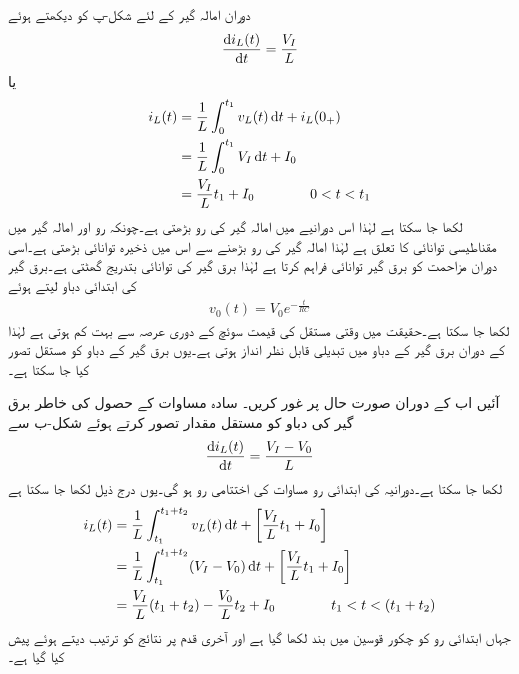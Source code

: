دوران  امالہ گیر کے لئے  شکل-پ کو دیکھتے ہوئے 
\begin{align*}
\frac{\dif i_L(t)}{\dif t}=\frac{V_I}{L}
\end{align*}
یا
\begin{gather}
\begin{aligned}\label{مساوات_عارضی_بڑھاتا_منبع_دباو_الف}
i_L(t)&=\frac{1}{L} \int_{0}^{t_1} v_L(t) \dif t+i_L(0_+)\\
&=\frac{1}{L}\int_{0}^{t_1} V_I \dif t+I_0\\
&=\frac{V_I}{L} t_1+I_0\quad \quad \quad \quad 0<t<t_1
\end{aligned}
\end{gather}
لکھا جا سکتا ہے لہٰذا اس دورانیے میں امالہ گیر کی رو بڑھتی ہے۔چونکہ  رو اور امالہ گیر میں مقناطیسی توانائی کا تعلق  ہے لہٰذا امالہ گیر کی رو بڑھنے سے اس میں ذخیرہ توانائی بڑھتی ہے۔اسی دوران مزاحمت  کو برق گیر توانائی فراہم کرتا ہے لہٰذا برق گیر کی توانائی بتدریج گھٹتی ہے۔برق گیر کی ابتدائی دباو  لیتے ہوئے 
\begin{align*}
v_0(t)=V_0 e^{-\frac{t}{RC}}
\end{align*}
لکھا جا سکتا ہے۔حقیقت میں  وقتی مستقل کی قیمت سوئچ کے دوری عرصہ  سے  بہت کم  ہوتی ہے  لہٰذا  کے دوران برق گیر کے دباو میں تبدیلی قابل نظر انداز ہوتی ہے۔یوں برق گیر کے دباو کو مستقل تصور کیا جا سکتا ہے۔

آئیں اب  کے دوران صورت حال پر غور کریں۔ سادہ مساوات کے حصول کی خاطر برق گیر کی دباو کو مستقل مقدار  تصور کرتے  ہوئے شکل-ب  سے
\begin{align*}
\frac{\dif i_L(t)}{\dif t}=\frac{V_I-V_0}{L}
\end{align*}
لکھا جا سکتا ہے۔دورانیہ  کی ابتدائی رو مساوات  کی اختتامی رو ہو گی۔یوں درج ذیل لکھا جا سکتا ہے 
\begin{gather}
\begin{aligned}\label{مساوات_عارضی_بڑھاتا_منبع_دباو_ب}
i_L(t)&=\frac{1}{L}\int_{t_1}^{t_1+t_2} v_L(t) \dif t+\left[\frac{V_I}{L} t_1+I_0\right]\\
&=\frac{1}{L}\int_{t_1}^{t_1+t_2}(V_I-V_0)\dif t+\left[\frac{V_I}{L} t_1+I_0\right]\\
&=\frac{V_I}{L}(t_1+t_2)-\frac{V_0}{L}t_2+I_0 \quad \quad \quad \quad t_1<t<(t_1+t_2)
\end{aligned}
\end{gather}
جہاں ابتدائی رو کو چکور قوسین میں بند لکھا گیا ہے اور آخری قدم پر نتائج کو ترتیب دیتے ہوئے پیش کیا گیا ہے۔

